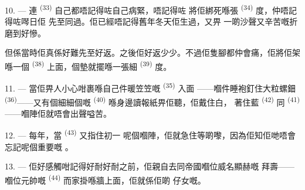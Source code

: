 \VUsaut{4.2mm}
\VUsaut{3.0mm}

10. --- 連 \textsuperscript{(33)} 自己都唔記得咗自己病緊，唔記得咗
將佢綁死喺張 \textsuperscript{(34)} 度，仲唔記得咗噖日佢
先至同過。佢已經唔記得舊年冬天佢生過，又畀
一啲沙聲又辛苦嘅折磨到好慘。

但係當時佢真係好難先至好返。之後佢好返少少。不過佢隻腳都仲會痛，佢將佢架喺一個
 \textsuperscript{(38)} 上面，個墊就擺喺一張細
\textsuperscript{(39)} 度。

11. --- 當佢畀人小心咁裹喺自己件暖笠笠嘅 \textsuperscript{(35)} 入面
——嗰件睡袍釘住大粒螺鈿 \textsuperscript{(36)}——又有個細細個嘅
 \textsuperscript{(40)} 喺身邊讀報紙畀佢聽，佢戴住白，
著住藍 \textsuperscript{(42)} 同 \textsuperscript{(41)}
——嗰陣佢就唔會出聲嗌苦。

12. --- 每年，當 \textsuperscript{(43)} 又指住初一
呢個嗰陣，佢就急住等啲嚟，因為佢知佢哋唔會忘記呢個重要嘅
。

13. --- 佢好感觸咁記得好耐好耐之前，佢親自去同帝國嗰位威名顯赫嘅
拜壽——嗰位元帥嘅 \textsuperscript{(44)} 而家掛喺牆上面，佢就係佢啲
仔女嘅。
\VUsaut{6.0mm}
\VUfilet{22mm}
